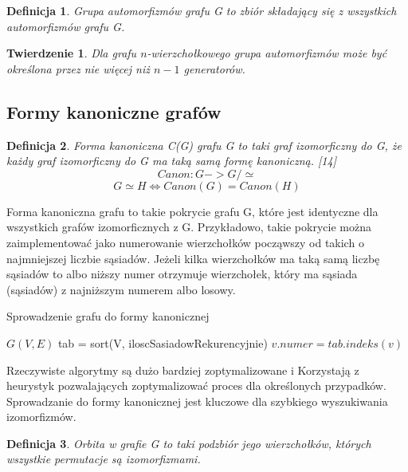 \documentclass[11pt]{article}
\newtheorem{theorem}{Twierdzenie}
\newtheorem{definition}{Definicja}[section]
\begin{document}
  \begin{definition}
    Grupa automorfizmów grafu G to zbiór składający się z wszystkich automorfizmów grafu G.
  \end{definition}

  \begin{theorem}
    Dla grafu $n$-wierzchołkowego grupa automorfizmów może być określona przez nie więcej niż 
    $n-1$ generatorów. 
  \end{theorem}

  \subsection{Formy kanoniczne grafów}

  \begin{definition}
    Forma kanoniczna C(G) grafu G to taki graf izomorficzny do G, że każdy graf izomorficzny do G ma taką samą formę kanoniczną. 
    [14]$$ Canon \colon G -> G/ \simeq $$
    $$G \simeq H \iff Canon(G) = Canon(H) $$


  \end{definition}

  Forma kanoniczna grafu to takie pokrycie grafu G, 
  które jest identyczne dla wszystkich grafów izomorficznych z G. Przykładowo, takie pokrycie można zaimplementować
   jako numerowanie wierzchołków począwszy od takich o najmniejszej liczbie sąsiadów. 
   Jeżeli kilka wierzchołków ma taką samą liczbę sąsiadów to albo niższy numer otrzymuje wierzchołek, 
   który ma sąsiada (sąsiadów) z najniższym numerem albo losowy. 


   \begin{algorithm}
    \caption{Sprowadzenie grafu do formy kanonicznej}
    \begin{algorithmic}
    \REQUIRE $G(V, E) $
    \STATE tab = sort(V, iloscSasiadowRekurencyjnie)
      \STATE $v.numer = tab.indeks(v) $
    \ENDFOR
    \end{algorithmic}
  \end{algorithm}
  
  Rzeczywiste algorytmy są dużo bardziej zoptymalizowane i Korzystają z 
  heurystyk pozwalających zoptymalizować proces dla określonych przypadków.
  Sprowadzanie do formy kanonicznej jest kluczowe dla szybkiego wyszukiwania izomorfizmów. 

\begin{definition}
  Orbita w grafie G to taki podzbiór jego wierzchołków, których wszystkie permutacje są izomorfizmami. 
\end{definition}
\end{document}
